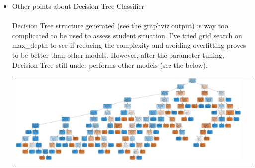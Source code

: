 \documentclass{article}
\begin{document}
\begin{itemize}
\begin{itemize}
\item Other points about Decision Tree Classifier
\\\\
Decision Tree structure generated (see the graphviz output) is way too complicated to be used to assess student situation. I've tried grid search on max\_depth to see if reducing the complexity and avoiding overfitting proves to be better than other models. However, after the parameter tuning, Decision Tree still under-performs other models (see the below).
\\
\begin{table}[H]\centering
\begin{tabular}{c c}
       \includegraphics[width=1.0\textwidth]{tree} \\
\end{tabular}
\end{table}

\end{itemize}

\color{black}


\end{itemize}
\end{document}
